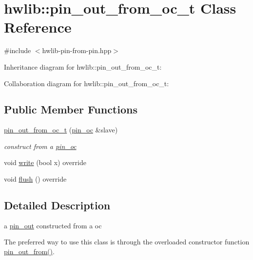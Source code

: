 \hypertarget{classhwlib_1_1pin__out__from__oc__t}{}\section{hwlib\+:\+:pin\+\_\+out\+\_\+from\+\_\+oc\+\_\+t Class Reference}
\label{classhwlib_1_1pin__out__from__oc__t}


{\ttfamily \#include $<$hwlib-\/pin-\/from-\/pin.\+hpp$>$}



Inheritance diagram for hwlib\+:\+:pin\+\_\+out\+\_\+from\+\_\+oc\+\_\+t\+:


Collaboration diagram for hwlib\+:\+:pin\+\_\+out\+\_\+from\+\_\+oc\+\_\+t\+:
\subsection*{Public Member Functions}
\begin{DoxyCompactItemize}
\item 
\mbox{\label{classhwlib_1_1pin__out__from__oc__t_a34c48960e28f9c8044290bcc2a90930f}} 
\hyperlink{classhwlib_1_1pin__out__from__oc__t_a34c48960e28f9c8044290bcc2a90930f}{pin\+\_\+out\+\_\+from\+\_\+oc\+\_\+t} (\hyperlink{classhwlib_1_1pin__oc}{pin\+\_\+oc} \&slave)
\begin{DoxyCompactList}\small\item\em construct from a \hyperlink{classhwlib_1_1pin__oc}{pin\+\_\+oc} \end{DoxyCompactList}\item 
void \hyperlink{classhwlib_1_1pin__out__from__oc__t_afdf1cb4bb1f50aa735986af3b0e49d01}{write} (bool x) override
\item 
void \hyperlink{classhwlib_1_1pin__out__from__oc__t_ae233e9c1b5f91ab242ca3611422de19c}{flush} () override
\end{DoxyCompactItemize}


\subsection{Detailed Description}
a \hyperlink{classhwlib_1_1pin__out}{pin\+\_\+out} constructed from a oc

The preferred way to use this class is through the overloaded constructor function \hyperlink{namespacehwlib_aa1e6aac16c5ac14715e165b463ec6a46}{pin\+\_\+out\+\_\+from()}. 


